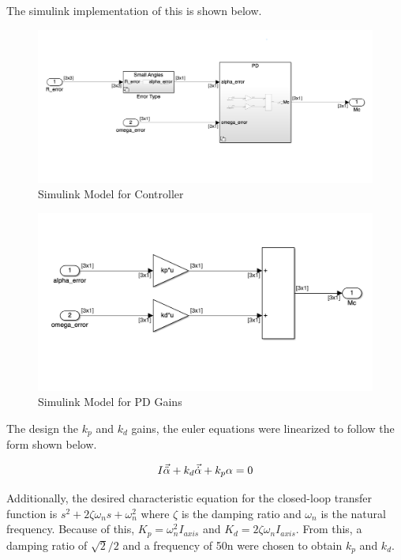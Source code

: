 The simulink implementation of this is shown below.

\begin{figure}[H]
    \centering
    \captionsetup{ justification = centering }
    \includegraphics[width = 15cm]{Images/PS9/controllerModel.png}
    \caption{Simulink Model for Controller}
    \label{fig:controllerSimulink}
\end{figure}

\begin{figure}[H]
    \centering
    \captionsetup{ justification = centering }
    \includegraphics[width = 15cm]{Images/PS9/PDController.png}
    \caption{Simulink Model for PD Gains}
    \label{fig:PDsimulink}
\end{figure}

The design the $k_p$ and $k_d$ gains, the euler equations were linearized to follow the form shown below.

\begin{equation}
    I \Vec{\Ddot{\alpha}} + k_d  \Vec{\dot \alpha} + k_p \alpha = 0
\end{equation}

Additionally, the desired characteristic equation for the closed-loop transfer function is $s^2 + 2\zeta\omega_n s +\omega_n^2$ where $\zeta$ is the damping ratio and $\omega_n$ is the natural frequency. Because of this, $K_p = \omega_n^2 I_{axis}$ and $K_d = 2\zeta\omega_n I_{axis}$. From this, a damping ratio of $\sqrt{2}/2$ and a frequency of 50n were chosen to obtain $k_p$ and $k_d$.

